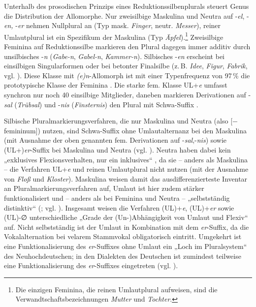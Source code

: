 Unterhalb des prosodischen Prinzips eines Reduktionssilbenplurals steuert Genus die Distribution der Allomorphe. Nur zweisilbige Maskulina und Neutra auf -\textit{el}, -\textit{en,} {}-\textit{er} nehmen Nullplural an (Typ mask. \textit{Finger}, neutr. \textit{Messer}), reiner Umlautplural ist ein Spezifikum der Maskulina (Typ \textit{Äpfel}).\footnote{Die einzigen Feminina, die reinen Umlautplural aufweisen, sind die Verwandtschaftsbezeichnungen \textit{Mutter} und \textit{Tochter}.} Zweisilbige Feminina auf Reduktionssilbe markieren den Plural dagegen immer additiv durch unsilbisches -\textit{n} (\textit{Gabe-n}, \textit{Gabel-n}, \textit{Kammer-n}). Silbisches -\textit{en} erscheint bei einsilbigen Singularformen oder bei betonter Finalsilbe (z.\,B. \textit{Idee}, \textit{Figur}, \textit{Fabrik}, vgl. \citealt[107]{Wiese1996}). Diese Klasse mit \textit{(e)n}{}-Allomorph ist mit einer Typenfrequenz von \mbox{97\,\%} die prototypische Klasse der Feminina \citep[46]{Pavlov1995}. Die starke fem. Klasse UL+\textit{e} umfasst synchron nur noch 40 einsilbige Mitglieder, daneben markieren Derivationen auf -\textit{sal} (\textit{Trübsal}) und -\textit{nis} (\textit{Finsternis}) den Plural mit Schwa-Suffix \citep[124]{Köpcke1993}.

Silbische Pluralmarkierungsverfahren, die nur Maskulina und Neutra (also [$-$femininum]) nutzen, sind Schwa-Suffix ohne Umlautalternanz bei den Maskulina (mit Ausnahme der oben genannten fem. Derivationen auf -\textit{sal},-\textit{nis}) sowie (UL+)\textit{er}{}-Suffix bei Maskulina und Neutra (vgl. \citealt[138]{Wiese2009}). Neutra haben dabei kein „exklusives Flexionsverhalten, nur ein inklusives“ \citep[299]{Nübling2008}, da sie -- anders als Maskulina -- die Verfahren UL+\textit{e} und reinen Umlautplural nicht nutzen (mit der Ausnahme von \textit{Floß} und \textit{Kloster}). Maskulina weisen damit das ausdifferenzierteste Inventar an Pluralmarkierungsverfahren auf, Umlaut ist hier zudem stärker funktionalisiert und -- anders als bei Feminina und Neutra -- „selbstständig distinktiv“ (\citealt[200--201]{Ronneberger-Sibold1990}; vgl. \citealt[29]{Nübling2013}). Insgesamt weisen die Verfahren (UL)+\textit{e}, (UL)+\textit{er} sowie (UL)-∅ unterschiedliche „Grade der (Un-)Abhängigkeit von Umlaut und Flexiv“ \citep[66]{Dammel2018} auf. Nicht selbstständig ist der Umlaut in Kombination mit dem \textit{er}{}-Suffix, da die Vokalalternation bei velarem Stammvokal obligatorisch eintritt. Umgekehrt ist eine Funktionalisierung des \textit{er}{}-Suffixes ohne Umlaut ein „Loch im Pluralsystem“ \citep[69]{Dammel2018} des Neuhochdeutschen; in den Dialekten des Deutschen ist zumindest teilweise eine Funktionalisierung des \textit{er}{}-Suffixes eingetreten (vgl. ).


